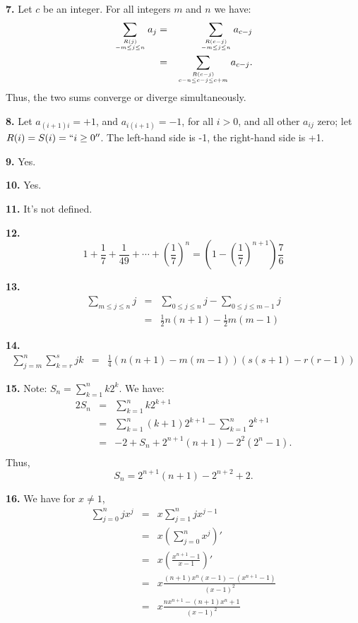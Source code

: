 \documentclass[a4paper,12pt]{article}
\newcommand{\newpar}[1]{\bigskip \noindent \textbf{#1.}}
\begin{document}
\newpar{7} Let $c$ be an integer.  For all integers $m$ and $n$ we
have:
\begin{eqnarray*}
\sum_{R(j)\atop-m\le j \le n}a_j &=& \sum_{R(c-j)\atop-m \le j \le n}a_{c-j}\\
&=& \sum_{R(c-j)\atop c-n\le c-j\le c+m}a_{c-j}.
\end{eqnarray*}
Thus, the two sums converge or diverge simultaneously.

\newpar{8} Let $a_{(i+1)i} = +1$, and $a_{i(i+1)} = -1$, for all 
$i > 0$, and all other $a_{ij}$ zero; let $R(i) = S(i) = ``i \ge 0''$.
The left-hand side is -1, the right-hand side is +1.

\newpar{9} Yes.

\newpar{10} Yes.

\newpar{11} It's not defined.

\newpar{12}
\[ 1 + \frac{1}{7} + \frac{1}{49} + \cdots +
\left(\frac{1}{7}\right)^n =
\left(1 - \left(\frac{1}{7}\right)^{n+1}\right)\frac{7}{6}\]

\newpar{13}
\begin{eqnarray*}
\sum_{m\le j\le n}j &=& \sum_{0\le j \le n}j - 
\sum_{0\le j \le  m-1}j\\ & = &
\frac{1}{2}n(n+1) - \frac{1}{2}m(m-1)
\end{eqnarray*}

\newpar{14}
\begin{eqnarray*}
\sum_{j=m}^n \sum_{k=r}^sjk & = &
\frac{1}{4} (n(n+1)-m(m-1))(s(s+1)-r(r-1))
\end{eqnarray*}

\newpar{15} Note: $S_n = \sum_{k = 1}^n k 2^k$.  We have:
\begin{eqnarray*}
2S_n &=& \sum_{k=1}^n k 2^{k+1}\\
&=& \sum_{k=1}^n (k+1)2^{k+1} - \sum_{k=1}^n2^{k+1}\\
&=& -2 + S_n + 2^{n+1}(n+1) - 2^2(2^n-1).\\
\end{eqnarray*} Thus,
\[ S_n = 2^{n+1}(n+1) - 2^{n+2}+2.\]

\newpar{16} We have for $x \not= 1$,
\begin{eqnarray*}
\sum_{j=0}^njx^j &=& x \sum_{j=1}^n jx^{j-1}\\
&=&x\left(\sum_{j=0}^nx^j\right)'\\
&=& x\left(\frac{x^{n+1} - 1}{x - 1}\right)'\\
&=& x \frac{(n+1)x^n(x-1)-(x^{n+1}-1)}{(x-1)^2}\\
&=& x \frac{nx^{n+1} -(n+1) x^n + 1}{(x-1)^2}
\end{eqnarray*}
\end{document}
